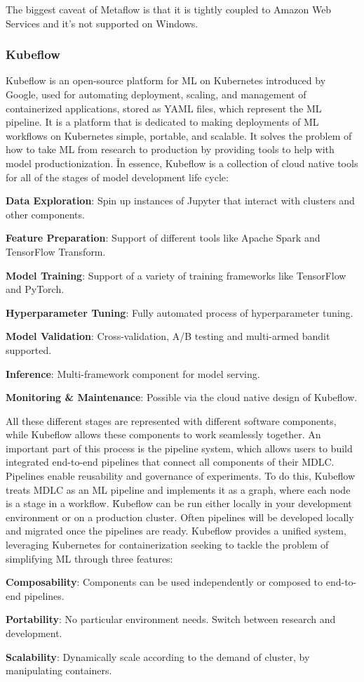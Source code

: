 The biggest caveat of Metaflow is that it is tightly coupled to Amazon Web Services and it's not supported on Windows.

\subsubsection*{Kubeflow}

Kubeflow is an open-source platform for ML on Kubernetes introduced by Google, used for automating deployment,
scaling, and management of containerized applications, stored as YAML files, which represent the ML pipeline. It is a
platform that is dedicated to making deployments of ML workflows on Kubernetes simple, portable, and scalable. It
solves the problem of how to take ML from research to production by providing tools to help with model
productionization. \v

In essence, Kubeflow is a collection of cloud native tools for all of the stages of model development life cycle:
\bit
\item \textbf{Data Exploration}: Spin up instances of Jupyter that interact with clusters and other components.
\item \textbf{Feature Preparation}: Support of different tools like Apache Spark and TensorFlow Transform.
\item \textbf{Model Training}: Support of a variety of training frameworks like TensorFlow and PyTorch.
\item \textbf{Hyperparameter Tuning}: Fully automated process of hyperparameter tuning.
\item \textbf{Model Validation}: Cross-validation, A/B testing and multi-armed bandit supported.
\item \textbf{Inference}: Multi-framework component for model serving.
\item \textbf{Monitoring \& Maintenance}: Possible via the cloud native design of Kubeflow.
\eit

All these different stages are represented with different software components, while Kubeflow allows these components
to work seamlessly together. An important part of this process is the pipeline system, which allows users to build
integrated end-to-end pipelines that connect all components of their MDLC. Pipelines enable reusability and
governance of experiments. To do this, Kubeflow treats MDLC as an ML pipeline and implements it as a graph, where
each node is a stage in a workflow. \v

Kubeflow can be run either locally in your development environment or on a production cluster. Often pipelines will
be developed locally and migrated once the pipelines are ready. Kubeflow provides a unified system, leveraging
Kubernetes for containerization seeking to tackle the problem of simplifying ML through three features:
\bit
\item \textbf{Composability}: Components can be used independently or composed to end-to-end pipelines.
\item \textbf{Portability}: No particular environment needs. Switch between research and development.
\item \textbf{Scalability}: Dynamically scale according to the demand of cluster, by manipulating containers.
\eit

